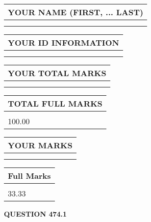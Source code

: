 \documentclass{ctexart}
\begin{document}
   
   
   
\newpage 
\setcounter{page}{ 
   474001 } 
   
   
   
   
\noindent\begin{tabular}{|l|}
\hline
YOUR NAME (FIRST, ... LAST)  \\
\hline
 \\ 
 \\ 
\hline
\end{tabular}
\hspace{0.05in} \begin{tabular}{|l|}
\hline
 YOUR   ID   INFORMATION  \\
\hline
 \\ 
 \\ 
\hline
\end{tabular}
   
   
\vspace{0.2in}\noindent\begin{tabular}{|l|}
\hline
YOUR TOTAL MARKS  \\
\hline
 \\ 
 \\ 
\hline
\end{tabular}
\hspace{0.05in} \begin{tabular}{|l|}
\hline
TOTAL FULL MARKS  \\
\hline
 \\ 
100.00 \\
\hline
\end{tabular}
   
   
 \vspace{0.2in}
 
 
 
 
   
   
  
\vspace{0.2in}
  
\noindent\begin{tabular}{|l|}
\hline
 YOUR MARKS  \\
\hline
 \\ 
 \\ 
\hline
\end{tabular}
\hspace{0.05in} \begin{tabular}{|l|}
\hline
 Full Marks  \\
\hline
 \\ 
33.33 \\
\hline
\end{tabular}
{\textbf{\Large{QUESTION
474.1 
}}}
  
\end{document}
